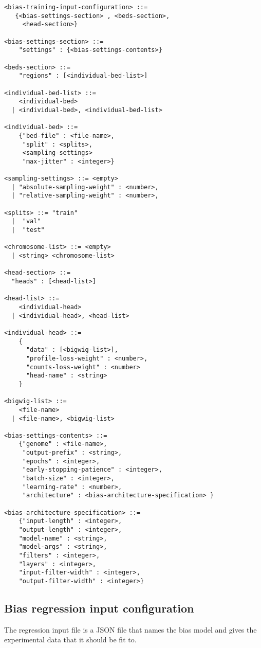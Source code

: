 \documentclass{article}
\begin{document}
\begin{lstlisting}
<bias-training-input-configuration> ::= 
   {<bias-settings-section> , <beds-section>, 
     <head-section>}

<bias-settings-section> ::= 
    "settings" : {<bias-settings-contents>}

<beds-section> ::= 
    "regions" : [<individual-bed-list>]

<individual-bed-list> ::= 
    <individual-bed> 
  | <individual-bed>, <individual-bed-list>

<individual-bed> ::= 
    {"bed-file" : <file-name>,
     "split" : <splits>,
     <sampling-settings>
     "max-jitter" : <integer>}

<sampling-settings> ::= <empty>
  | "absolute-sampling-weight" : <number>,
  | "relative-sampling-weight" : <number>,

<splits> ::= "train"
  |  "val" 
  |  "test"

<chromosome-list> ::= <empty> 
  | <string> <chromosome-list>

<head-section> ::= 
  "heads" : [<head-list>]

<head-list> ::= 
    <individual-head>
  | <individual-head>, <head-list>

<individual-head> ::=
    {
      "data" : [<bigwig-list>],
      "profile-loss-weight" : <number>,
      "counts-loss-weight" : <number>
      "head-name" : <string>
    }

<bigwig-list> ::=
    <file-name> 
  | <file-name>, <bigwig-list>

<bias-settings-contents> ::= 
    {"genome" : <file-name>, 
     "output-prefix" : <string>, 
     "epochs" : <integer>, 
     "early-stopping-patience" : <integer>, 
     "batch-size" : <integer>, 
     "learning-rate" : <number>, 
     "architecture" : <bias-architecture-specification> } 

<bias-architecture-specification> ::= 
    {"input-length" : <integer>, 
    "output-length" : <integer>,
    "model-name" : <string>,
    "model-args" : <string>,
    "filters" : <integer>,
    "layers" : <integer>,
    "input-filter-width" : <integer>,
    "output-filter-width" : <integer>}
\end{lstlisting}
                    

\subsection{Bias regression input configuration}
The regression input file is a JSON file that names the bias model and gives the experimental data that it should be fit to. 
\end{document}
